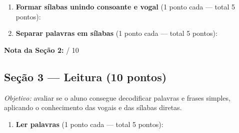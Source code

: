 \begin{avaliacao}
\begin{enumerate}[resume]
  \item \textbf{Formar sílabas unindo consoante e vogal} (1 ponto cada — total 5 pontos):

  \begin{center}
  \end{center}

  \item \textbf{Separar palavras em sílabas} (1 ponto cada — total 5 pontos):

  \begin{center}
  \end{center}
\end{enumerate}

\medskip
\noindent\textbf{Nota da Seção 2:} \underline{\hspace{1cm}} / 10

\subsection*{Seção 3 — Leitura (10 pontos)}

\textit{Objetivo:} avaliar se o aluno consegue decodificar palavras e frases
simples, aplicando o conhecimento das vogais e das sílabas diretas.

\begin{enumerate}[resume]
  \item \textbf{Ler palavras} (1 ponto cada — total 5 pontos):


\end{enumerate}
\end{avaliacao}
